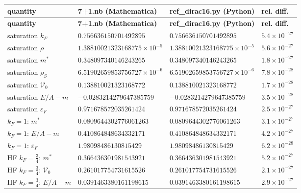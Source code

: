 \documentclass[10pt,a4paper]{article}
\begin{document}
{\footnotesize
\begin{longtable}{>{\raggedright\arraybackslash}p{}>{\raggedright\arraybackslash}p{}>{\raggedright\arraybackslash}p{}>{\raggedright\arraybackslash}p{}}
\toprule
\textbf{quantity} & \textbf{7+1.nb (Mathematica)} & \textbf{ref\_dirac16.py (Python)} & \textbf{rel. diff.} \\
\midrule\endfirsthead
\toprule
\textbf{quantity} & \textbf{7+1.nb (Mathematica)} & \textbf{ref\_dirac16.py (Python)} & \textbf{rel. diff.} \\
\midrule\endhead
\endfoot
\bottomrule\endlastfoot
saturation $k_F$ & $0.756636150701492895$ & $0.756636150701492895$ & $5.4\times10^{-27}$ \\
saturation $\rho$ & $1.38810021323168775\times10^{-5}$ & $1.38810021323168775\times10^{-5}$ & $5.6\times10^{-27}$ \\
saturation $m^*$ & $0.348097340146243265$ & $0.348097340146243265$ & $1.8\times10^{-27}$ \\
saturation $\rho_S$ & $6.51902659853756727\times10^{-6}$ & $6.51902659853756727\times10^{-6}$ & $7.8\times10^{-28}$ \\
saturation $\mathcal V_0$ & $0.138810021323168772$ & $0.138810021323168772$ & $1.7\times10^{-28}$ \\
saturation $E/A-m$ & $-0.0283214279647385759$ & $-0.0283214279647385759$ & $3.5\times10^{-28}$ \\
saturation $\varepsilon_F$ & $0.971678572035261424$ & $0.971678572035261424$ & $2.5\times10^{-27}$ \\
$k_F=1$: $m^*$ & $0.0809644302776061263$ & $0.0809644302776061263$ & $3.1\times10^{-27}$ \\
$k_F=1$: $E/A-m$ & $0.410864848634332171$ & $0.410864848634332171$ & $4.2\times10^{-27}$ \\
$k_F=1$: $\varepsilon_F$ & $1.98098486130815429$ & $1.98098486130815429$ & $6.2\times10^{-28}$ \\
HF $k_F=\frac34$: $m^*$ & $0.366436301981543921$ & $0.366436301981543921$ & $5.2\times10^{-27}$ \\
HF $k_F=\frac34$: $\mathcal V_0$ & $0.261017754731615526$ & $0.261017754731615526$ & $2.1\times10^{-27}$ \\
HF $k_F=\frac34$: $E/A-m$ & $0.0391463380161198615$ & $0.0391463380161198615$ & $2.9\times10^{-27}$ \\

\end{longtable}}
\end{document}
